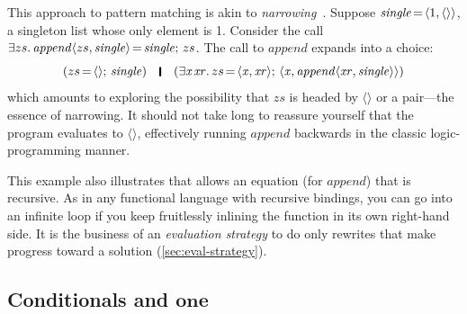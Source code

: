 \documentclass[acmsmall]{acmart}
\newcommand{\Varid}[1]{\mathit{#1}}
\begin{document}
This approach to pattern matching is akin to \emph{narrowing}~\cite{hanus:survey}.
Suppose \ensuremath{\Varid{single}\hspace{-0.14em}=\hspace{-0.14em}\langle{}\mathrm{1},\langle\rangle\rangle}, a singleton list whose only element is 1.
Consider the call \ensuremath{\exists zs .\,\Varid{append}\langle zs ,\Varid{single}\rangle\hspace{-0.14em}=\hspace{-0.14em}\Varid{single};\, zs }.
The call to \ensuremath{\Varid{append}} expands into a choice:
$$
  \ensuremath{( zs \hspace{-0.14em}=\hspace{-0.14em}\langle\rangle;\,\Varid{single})} \quad \ensuremath{\rule[-0.1em]{0.15em}{0.75em}} \quad
  \ensuremath{(\exists\Varid{x}\hspace{0.1em}\Varid{xr}.\, zs \hspace{-0.14em}=\hspace{-0.14em}\langle{}\Varid{x},\Varid{xr}\rangle;\,\langle{}\Varid{x},\Varid{append}\langle\Varid{xr},\Varid{single}\rangle\rangle)}
$$
which amounts to exploring the possibility that \ensuremath{ zs } is headed by \ensuremath{\langle\rangle} or a pair---the
essence of narrowing.  It should not take long to reassure yourself that the program
evaluates to \ensuremath{\langle\rangle}, effectively running \ensuremath{\Varid{append}} backwards in the classic logic-programming manner.

This example also illustrates that \versecalc{} allows an equation (for \ensuremath{\Varid{append}})
that is recursive. As in any functional language with recursive bindings, you can
go into an infinite loop if you keep fruitlessly inlining the function in its own right-hand side.
It is the business of an \emph{evaluation strategy} to do only rewrites that make
progress toward a solution (\cref{sec:eval-strategy}).

\subsection{Conditionals and \texorpdfstring{\ensuremath{\textbf{one}}}{``one''}} \label{sec:rigid} \label{sec:one} \label{sec:if}
\end{document}
